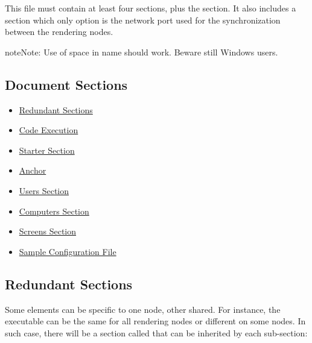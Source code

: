 \documentclass[a4,10pt,openany,oneside]{sphinxmanual}
\begin{document}
This file must contain at least four sections, plus the  section.
It also includes a  section which only option is the network port used for the synchronization between the rendering nodes.

\begin{notice}{note}{Note:}
Use of space in  name should work. Beware still Windows users.
\end{notice}


\subsection{Document Sections}
\label{components/configuration-file:document-sections}\begin{itemize}
\item {} 
{\hyperref[components/configuration-file:redundant-sections]{Redundant Sections}}

\item {} 
{\hyperref[components/configuration-file:code-execution]{Code Execution}}

\item {} 
{\hyperref[components/configuration-file:starter-section]{Starter Section}}

\item {} 
{\hyperref[components/configuration-file:anchor]{Anchor}}

\item {} 
{\hyperref[components/configuration-file:users-section]{Users Section}}

\item {} 
{\hyperref[components/configuration-file:computers-section]{Computers Section}}

\item {} 
{\hyperref[components/configuration-file:screens-section]{Screens Section}}

\item {} 
{\hyperref[components/configuration-file:sample-configuration-file]{Sample Configuration File}}

\end{itemize}


\subsection{Redundant Sections}
\label{components/configuration-file:redundant-sections}
Some elements can be specific to one node, other shared. For instance, the  executable can be the same for all rendering nodes or different on some nodes. In such case, there will be a section called  that can be inherited by each  sub-section:
\end{document}
